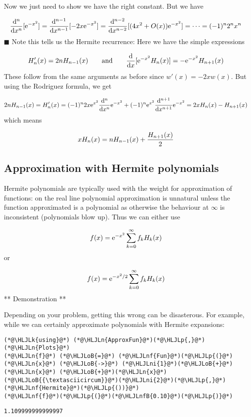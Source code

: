 \documentclass[12pt,landscape]{article}
\newcommand{\HLJLk}[1]{\textcolor[RGB]{148,91,176}{\textbf{#1}}}
\newcommand{\HLJLn}[1]{#1}
\newcommand{\HLJLnf}[1]{\textcolor[RGB]{66,102,213}{#1}}
\newcommand{\HLJLnfB}[1]{\textcolor[RGB]{59,151,46}{#1}}
\newcommand{\HLJLni}[1]{\textcolor[RGB]{59,151,46}{#1}}
\newcommand{\HLJLoB}[1]{\textcolor[RGB]{102,102,102}{\textbf{#1}}}
\newcommand{\HLJLp}[1]{#1}
\def\qqand{\qquad\hbox{and}\qquad}
\def\D{ {\rm d} }
\def\E{ {\rm e} }
\def\dx{\D x}
\begin{document}
{Now we just need to show we have the right constant. But we have

\[
 {\D^n \over \dx^n}[\E^{-x^2}] =  {\D^{n-1} \over \dx^{n-1}}[-2x \E^{-x^2}] = {\D^{n-2} \over \dx^{n-2}}[(4x^2 + O(x)) \E^{-x^2}] = \cdots = (-1)^n 2^n x^n
\]
\ensuremath{\blacksquare}
\newpage
Note this tells us the Hermite recurrence: Here we have the simple expressions

\[
H_n'(x) = 2n H_{n-1}(x) \qqand {\D \over \dx}[\E^{-x^2} H_n(x)] = -\E^{-x^2} H_{n+1}(x)
\]
These follow from the same arguments as before since $w'(x) = -2x w(x)$. But using the Rodriguez formula, we get

\[
2n H_{n-1}(x)  = H_{n}'(x) = (-1)^{n} 2 x  \E^{x^2}  {\D^{n} \over \dx^{n}} \E^{-x^2}  + (-1)^n \E^{x^2}  {\D^{n+1} \over \dx^{n+1}} \E^{-x^2} = 2x H_n(x) - H_{n+1}(x)
\]
which means

\[
x H_n(x) = nH_{n-1}(x) +{H_{n+1}(x) \over 2}
\]
\newpage
\subsection{Approximation with Hermite polynomials}
Hermite polynomials are typically used with the weight for approximation of functions: on the real line polynomial approximation is unnatural unless  the function approximated is a polynomial as otherwise the behaviour at \ensuremath{\infty} is inconsistent (polynomials blow up).  Thus we can either use

\[
f(x) = \E^{-x^2}\sum_{k=0}^\infty f_k H_k(x)
\]
or

\[
f(x) = \E^{-x^2/2}\sum_{k=0}^\infty f_k H_k(x)
\]
** Demonstration **

Depending on your problem, getting this wrong can be disasterous. For example, while we can certainly approximate polynomials with Hermite expansions:


\begin{lstlisting}
(*@\HLJLk{using}@*) (*@\HLJLn{ApproxFun}@*)(*@\HLJLp{,}@*) (*@\HLJLn{Plots}@*)
(*@\HLJLn{f}@*) (*@\HLJLoB{=}@*) (*@\HLJLnf{Fun}@*)(*@\HLJLp{(}@*)(*@\HLJLn{x}@*) (*@\HLJLoB{->}@*) (*@\HLJLni{1}@*)(*@\HLJLoB{+}@*)(*@\HLJLn{x}@*) (*@\HLJLoB{+}@*)(*@\HLJLn{x}@*)(*@\HLJLoB{{\textasciicircum}}@*)(*@\HLJLni{2}@*)(*@\HLJLp{,}@*) (*@\HLJLnf{Hermite}@*)(*@\HLJLp{())}@*)
(*@\HLJLnf{f}@*)(*@\HLJLp{(}@*)(*@\HLJLnfB{0.10}@*)(*@\HLJLp{)}@*)
\end{lstlisting}

\begin{lstlisting}
1.109999999999997
\end{lstlisting}


}
\end{document}
